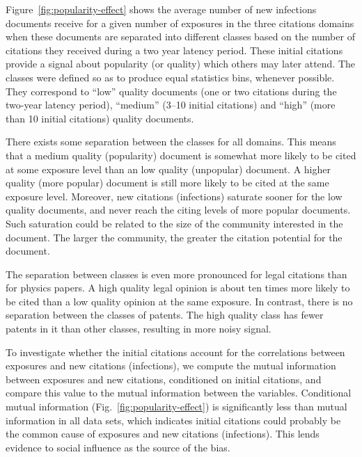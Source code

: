 \documentclass[10pt]{bmc_article}
\newenvironment{bmcformat}{\baselineskip20pt\sloppy\setboolean{publ}{false}}{\baselineskip20pt\sloppy}
\begin{document}
\begin{bmcformat}
Figure~\ref{fig:popularity-effect} shows the average number of new infections documents receive for a given number of exposures in the three citations domains when these documents are separated into different classes based on the number of citations they received during a two year latency period. These initial citations provide a signal about popularity (or quality) which others may later attend. The classes were defined so as to produce equal statistics bins, whenever possible. They correspond to ``low'' quality documents (one or two citations during the two-year latency period), ``medium'' (3--10 initial citations) and ``high'' (more than 10 initial citations) quality documents.

There exists some separation between the classes for all domains. This means that a medium quality (popularity) document is somewhat more likely to be cited at some exposure level than an low quality (unpopular) document. A higher quality (more popular) document is still more likely to be cited at the same exposure level. Moreover, new citations (infections) saturate sooner for the low quality documents, and never reach the citing levels of more popular documents. Such saturation could be related to the size of the community interested in the document. The larger the community, the greater the citation potential for the document.

The separation between classes is even more pronounced for legal citations than for physics papers. A high quality legal opinion is about ten times more likely to be cited than a low quality opinion at the same exposure. In contrast, there is no separation between the classes of patents. The high quality class has fewer patents in it than other classes, resulting in more noisy signal.


To investigate whether the initial citations account for the correlations between exposures and new citations (infections), we compute the mutual information between exposures and new citations, conditioned on initial citations, and compare this value to the mutual information between the variables. %
Conditional mutual information (Fig.~\ref{fig:popularity-effect}) is significantly less than mutual information in all data sets, %
which indicates initial citations could probably be the common cause of exposures and new citations (infections). This lends evidence to social influence as the source of the bias.


\end{bmcformat}
\end{document}
